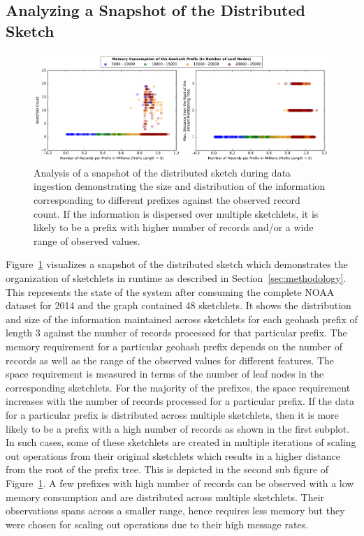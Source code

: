 \subsection{Analyzing a Snapshot of the Distributed Sketch}
\begin{figure}[t!]
    \centerline{\includegraphics[width=\linewidth]{figures/scaleout_graph_analysis.pdf}}
    \caption{Analysis of a snapshot of the distributed sketch during data ingestion demonstrating the size and distribution of the information corresponding to different prefixes against the observed record count. If the information is dispersed over multiple sketchlets, it is likely to be a prefix with higher number of records and/or a wide range of observed values.}
    \label{fig:scaleout-graph-analysis}
\end{figure}
%
Figure~\ref{fig:scaleout-graph-analysis} visualizes a snapshot of the distributed sketch which demonstrates the organization of sketchlets in runtime as described in Section~\ref{sec:methodology}. 
This represents the state of the system after consuming the complete NOAA dataset for 2014 and the graph contained 48 sketchlets. 
It shows the distribution and size of the information maintained across sketchlets for each geohash prefix of length 3 against the number of records processed for that particular prefix.
The memory requirement for a particular geohash prefix depends on the number of records as well as the range of the observed values for different features.
The space requirement is measured in terms of the number of leaf nodes in the corresponding sketchlets.
For the majority of the prefixes, the space requirement increases with the number of records processed for a particular prefix.
If the data for a particular prefix is distributed across multiple sketchlets, then it is more likely to be a prefix with a high number of records as shown in the first subplot.
In such cases, some of these sketchlets are created in multiple iterations of scaling out operations from their original sketchlets which results in a higher distance from the root of the prefix tree. This is depicted in the second sub figure of Figure~\ref{fig:scaleout-graph-analysis}.
A few prefixes with high number of records can be observed with a low memory consumption and are distributed across multiple sketchlets.
Their observations spans across a smaller range, hence requires less memory but they were chosen for scaling out operations due to their high message rates. 


